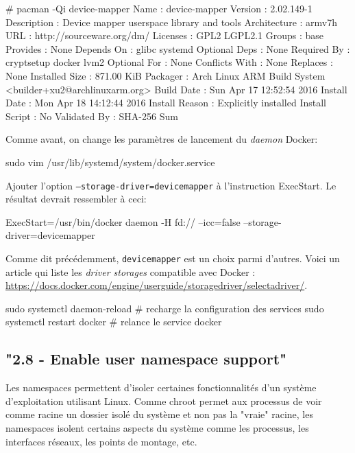 \documentclass[11pt,a4paper,oneside]{report}
\newcommand{\code}[1]{\texttt{#1}}
\begin{document}
\begin{bashcode}
# pacman -Qi device-mapper
Name            : device-mapper
Version         : 2.02.149-1
Description     : Device mapper userspace library and tools
Architecture    : armv7h
URL             : http://sourceware.org/dm/
Licenses        : GPL2  LGPL2.1
Groups          : base
Provides        : None
Depends On      : glibc  systemd
Optional Deps   : None
Required By     : cryptsetup  docker  lvm2
Optional For    : None
Conflicts With  : None
Replaces        : None
Installed Size  : 871.00 KiB
Packager        : Arch Linux ARM Build System <builder+xu2@archlinuxarm.org>
Build Date      : Sun Apr 17 12:52:54 2016
Install Date    : Mon Apr 18 14:12:44 2016
Install Reason  : Explicitly installed
Install Script  : No
Validated By    : SHA-256 Sum
\end{bashcode}

Comme avant, on change les paramètres de lancement du \textit{daemon} Docker:

\begin{bashcode}
sudo vim /usr/lib/systemd/system/docker.service
\end{bashcode}

Ajouter l'option \code{--storage-driver=devicemapper} à l'instruction ExecStart. Le résultat devrait ressembler à ceci:

\begin{bashcode}
ExecStart=/usr/bin/docker daemon -H fd:// --icc=false --storage-driver=devicemapper
\end{bashcode}

Comme dit précédemment, \code{devicemapper} est un choix parmi d'autres. Voici un article qui liste les \textit{driver storages} compatible avec Docker : \url{https://docs.docker.com/engine/userguide/storagedriver/selectadriver/}.

\begin{bashcode}
sudo systemctl daemon-reload # recharge la configuration des services
sudo systemctl restart docker # relance le service docker
\end{bashcode}


\subsection{"2.8 - Enable user namespace support"}
Les namespaces permettent d'isoler certaines fonctionnalités d'un système d'exploitation utilisant Linux. Comme chroot permet aux processus de voir comme racine un dossier isolé du système et non pas la "vraie" racine, les namespaces isolent certains aspects du système comme les processus, les interfaces réseaux, les points de montage, etc.
\end{document}
